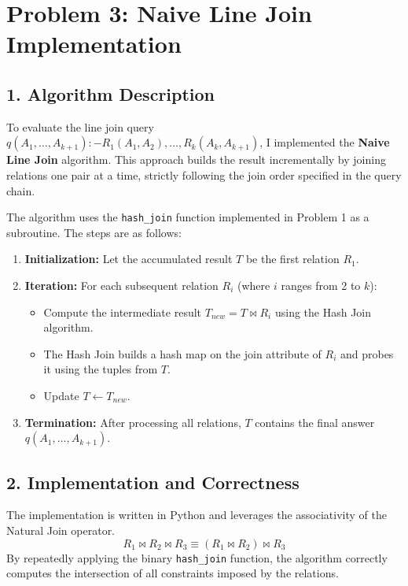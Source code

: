 \documentclass[11pt]{article}
\begin{document}
\section*{Problem 3: Naive Line Join Implementation}

\subsection*{1. Algorithm Description}
To evaluate the line join query $q(A_1, \dots, A_{k+1}) :- R_1(A_1, A_2), \dots, R_k(A_k, A_{k+1})$, I implemented the \textbf{Naive Line Join} algorithm. This approach builds the result incrementally by joining relations one pair at a time, strictly following the join order specified in the query chain.

The algorithm uses the \texttt{hash\_join} function implemented in Problem 1 as a subroutine. The steps are as follows:

\begin{enumerate}
    \item \textbf{Initialization:} Let the accumulated result $T$ be the first relation $R_1$.
    \item \textbf{Iteration:} For each subsequent relation $R_i$ (where $i$ ranges from 2 to $k$):
    \begin{itemize}
        \item Compute the intermediate result $T_{new} = T \bowtie R_i$ using the Hash Join algorithm.
        \item The Hash Join builds a hash map on the join attribute of $R_i$ and probes it using the tuples from $T$.
        \item Update $T \leftarrow T_{new}$.
    \end{itemize}
    \item \textbf{Termination:} After processing all relations, $T$ contains the final answer $q(A_1, \dots, A_{k+1})$.
\end{enumerate}

\subsection*{2. Implementation and Correctness}
The implementation is written in Python and leverages the associativity of the Natural Join operator. 
\[ R_1 \bowtie R_2 \bowtie R_3 \equiv (R_1 \bowtie R_2) \bowtie R_3 \]
By repeatedly applying the binary \texttt{hash\_join} function, the algorithm correctly computes the intersection of all constraints imposed by the relations.
\end{document}
